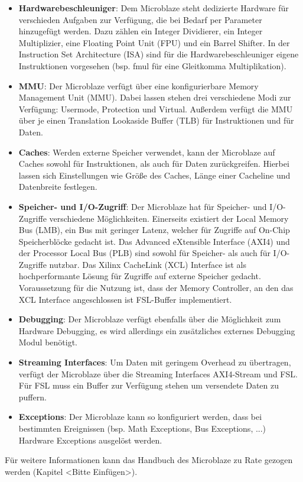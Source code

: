 \begin{itemize}
\item \textbf{Hardwarebeschleuniger}: Dem Microblaze steht dedizierte Hardware für verschieden Aufgaben zur Verfügung, die bei Bedarf per Parameter hinzugefügt werden. Dazu zählen ein Integer Dividierer, ein Integer Multiplizier, eine Floating Point Unit (FPU) und ein Barrel Shifter. In der Instruction Set Architecture (ISA) sind für die Hardwarebeschleuniger eigene Instruktionen vorgesehen (bsp. fmul für eine Gleitkomma Multiplikation).
\item \textbf{MMU}: Der Microblaze verfügt über eine konfigurierbare Memory Management Unit (MMU). Dabei lassen stehen drei verschiedene Modi zur Verfügung: Usermode, Protection und Virtual. Außerdem verfügt die MMU über je einen Translation Lookaside Buffer (TLB) für Instruktionen und für Daten.
\item \textbf{Caches}: Werden externe Speicher verwendet, kann der Microblaze auf Caches sowohl für Instruktionen, als auch für Daten zurückgreifen. Hierbei lassen sich Einstellungen wie Größe des Caches, Länge einer Cacheline und Datenbreite festlegen.
\item \textbf{Speicher- und I/O-Zugriff}: Der Microblaze hat für Speicher- und I/O-Zugriffe verschiedene Möglichkeiten. Einerseits existiert der Local Memory Bus (LMB), ein Bus mit geringer Latenz, welcher für Zugriffe auf On-Chip Speicherblöcke gedacht ist. Das Advanced eXtensible Interface (AXI4) und der Processor Local Bus (PLB) sind sowohl für Speicher- als auch für I/O-Zugriffe nutzbar.
Das Xilinx CacheLink (XCL) Interface ist als hochperformante Lösung für Zugriffe auf externe Speicher gedacht. Voraussetzung für die Nutzung ist, dass der Memory Controller, an den das XCL Interface angeschlossen ist FSL-Buffer implementiert.
\item \textbf{Debugging}: Der Microblaze verfügt ebenfalls über die Möglichkeit zum Hardware Debugging, es wird allerdings ein zusätzliches externes Debugging Modul benötigt.
\item \textbf{Streaming Interfaces}: Um Daten mit geringem Overhead zu übertragen, verfügt der Microblaze über die Streaming Interfaces AXI4-Stream und FSL. Für FSL muss ein Buffer zur Verfügung stehen um versendete Daten zu puffern.
\item \textbf{Exceptions}: Der Microblaze kann so konfiguriert werden, dass bei bestimmten Ereignissen (bsp. Math Exceptions, Bus Exceptions, ...) Hardware Exceptions ausgelöst werden.
\end{itemize}
Für weitere Informationen kann das Handbuch des Microblaze zu Rate gezogen werden (Kapitel <Bitte Einfügen>). %
